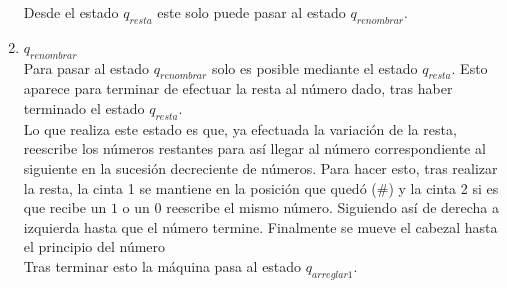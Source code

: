 \documentclass[12pt]{article}
\begin{document}
\begin{enumerate}
    Desde el estado $q_{resta}$ este solo puede pasar al estado $q_{renombrar}$. \\
     \item {\large $q_{renombrar}$} \vspace{0.2cm}\\
     Para pasar al estado $q_{renombrar}$ solo es posible mediante el estado $q_{resta}$. Esto aparece para terminar de efectuar la resta al número dado, tras haber terminado el estado $q_{resta}$. \\
     Lo que realiza este estado es que, ya efectuada la variación de la resta, reescribe los números restantes para así llegar al número correspondiente al siguiente en la sucesión decreciente de números. Para hacer esto, tras realizar la resta, la cinta 1 se mantiene en la posición que quedó (\#) y la cinta 2 si es que recibe un $1$ o un $0$ reescribe el mismo número. Siguiendo así de derecha a izquierda hasta que el número termine. Finalmente se mueve el cabezal hasta el principio del número \\
     Tras terminar esto la máquina pasa al estado  $q_{arreglar1}$.\\
     

\end{enumerate}
\end{document}
